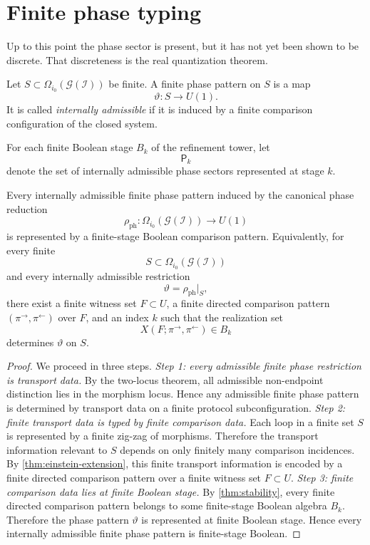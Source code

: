 \section{Finite phase typing}
\label{sec:em-finite-phase-typing}
Up to this point the phase sector is present, but it has not yet been
shown to be discrete.
That discreteness is the real quantization theorem.
\begin{definition}
	Let \(S\subset \Omega_{i_0}(\mathcal G(\mathcal I))\) be finite.
	A finite phase pattern on \(S\) is a map
	\[
		\vartheta:S\to U(1).
	\]
	It is called \emph{internally admissible} if it is induced by a finite
	comparison configuration of the closed system.
\end{definition}
\begin{definition}
	For each finite Boolean stage \(B_k\) of the refinement tower, let
	\[
		\mathsf P_k
	\]
	denote the set of internally admissible phase sectors represented at
	stage \(k\).
\end{definition}
\begin{theorem}
	\label{thm:em-finite-phase-typing}
	Every internally admissible finite phase pattern induced by the
	canonical phase reduction
	\[
		\rho_{\mathrm{ph}}:\Omega_{i_0}(\mathcal G(\mathcal I))\to U(1)
	\]
	is represented by a finite-stage Boolean comparison pattern.
	Equivalently, for every finite
	\[
		S\subset \Omega_{i_0}(\mathcal G(\mathcal I))
	\]
	and every internally admissible restriction
	\[
		\vartheta=\rho_{\mathrm{ph}}|_S,
	\]
	there exist a finite witness set \(F\subset U\), a finite directed
	comparison pattern \((\pi^\rightarrow,\pi^\leftarrow)\) over \(F\), and
	an index \(k\) such that the realization set
	\[
		X(F;\pi^\rightarrow,\pi^\leftarrow)\in B_k
	\]
	determines \(\vartheta\) on \(S\).
\end{theorem}
\begin{proof}
	We proceed in three steps.
	\smallskip
	\noindent\emph{Step 1: every admissible finite phase restriction is
		transport data.}
	By the two-locus theorem, all admissible non-endpoint distinction lies
	in the morphism locus.
	Hence any admissible finite phase pattern is determined by transport
	data on a finite protocol subconfiguration.
	\smallskip
	\noindent\emph{Step 2: finite transport data is typed by finite
		comparison data.}
	Each loop in a finite set \(S\) is represented by a finite zig-zag of
	morphisms.
	Therefore the transport information relevant to \(S\) depends on only
	finitely many comparison incidences.
	By \cref{thm:einstein-extension}, this finite transport
	information is encoded by a finite directed comparison pattern over a
	finite witness set \(F\subset U\).
	\smallskip
	\noindent\emph{Step 3: finite comparison data lies at finite Boolean
		stage.}
	By \cref{thm:stability}, every finite
	directed comparison pattern belongs to some finite-stage Boolean
	algebra \(B_k\).
	Therefore the phase pattern \(\vartheta\) is represented at finite
	Boolean stage.
	Hence every internally admissible finite phase pattern is finite-stage
	Boolean.
\end{proof}
